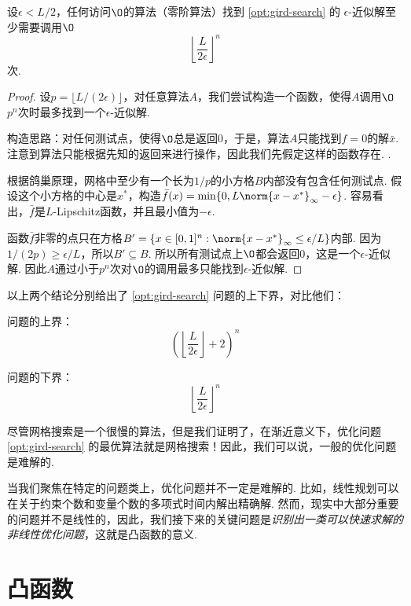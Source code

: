 \begin{theorem}\label{thm:gird-search-lower-bound}
    设$\epsilon<L/2$，任何访问$\O$的算法（零阶算法）找到 \eqref{opt:gird-search} 的 $\epsilon$-近似解至少需要调用$\O$
    \[\left\lfloor\frac{L}{2\epsilon}\right\rfloor^n\]
    次.
\end{theorem}
\begin{proof}
设$p=\lfloor L/(2\epsilon)\rfloor$，对任意算法$A$，我们尝试构造一个函数，使得$A$调用$\O$ $p^n$次时最多找到一个$\epsilon$-近似解.

构造思路：对任何测试点，使得$\O$总是返回$0$，于是，算法$A$只能找到$f=0$的解$\bar{x}$. 注意到算法只能根据先知的返回来进行操作，因此我们先假定这样的函数存在. . 

根据鸽巢原理，网格中至少有一个长为$1/p$的小方格$B$内部没有包含任何测试点. 假设这个小方格的中心是$x^*$，构造$\bar f(x)=\min\{0,L\norm{x-x^*}_\infty-\epsilon\}$. 容易看出，$\bar f$是$L$-Lipschitz函数，并且最小值为$-\epsilon$.

函数$\bar f$非零的点只在方格$B'=\{x\in[0,1]^n:\norm{x-x^*}_\infty\leq\epsilon/L\}$内部. 因为$1/(2p)\geq \epsilon/L$，所以$B'\subseteq B$. 所以所有测试点上$\O$都会返回$0$，这是一个$\epsilon$-近似解. 因此$A$通过小于$p^n$次对$\O$的调用最多只能找到$\epsilon$-近似解.
\end{proof}

以上两个结论分别给出了 \eqref{opt:gird-search} 问题的上下界，对比他们：
\begin{center}
\begin{minipage}[t]{0.4\textwidth}
问题的上界：
\[\left(\left\lfloor\frac{L}{2\epsilon}\right\rfloor+2\right)^n\]
\end{minipage}
\begin{minipage}[t]{0.4\textwidth}
问题的下界：
    \[\left\lfloor\frac{L}{2\epsilon}\right\rfloor^n\]
\end{minipage}
\end{center}
尽管网格搜索是一个很慢的算法，但是我们证明了，在渐近意义下，优化问题 \eqref{opt:gird-search} 的最优算法就是网格搜索！因此，我们可以说，一般的优化问题是难解的. 

当我们聚焦在特定的问题类上，优化问题并不一定是难解的. 比如，线性规划可以在关于约束个数和变量个数的多项式时间内解出精确解. 然而，现实中大部分重要的问题并不是线性的，因此，我们接下来的关键问题是\textit{识别出一类可以快速求解的非线性优化问题}，这就是凸函数的意义. 


\section{凸函数}\label{sec:convex-function}

